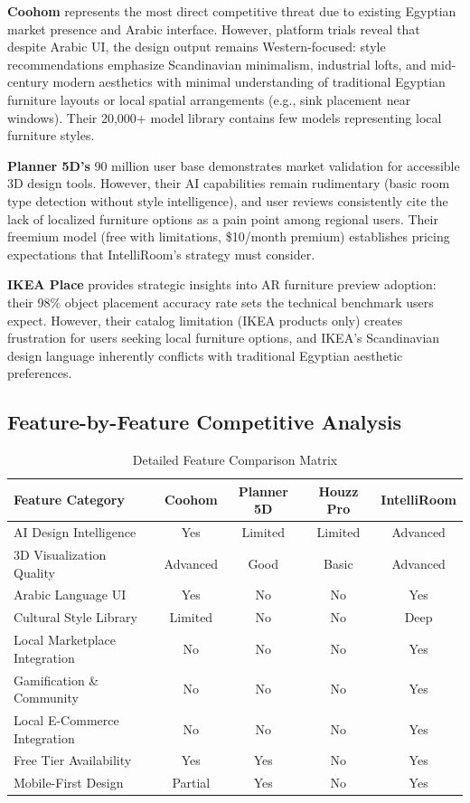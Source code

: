 \textbf{Coohom} represents the most direct competitive threat due to existing Egyptian market presence and Arabic interface. However, platform trials reveal that despite Arabic UI, the design output remains Western-focused: style recommendations emphasize Scandinavian minimalism, industrial lofts, and mid-century modern aesthetics with minimal understanding of traditional Egyptian furniture layouts or local spatial arrangements (e.g., sink placement near windows). Their 20,000+ model library contains few models representing local furniture styles.

\textbf{Planner 5D's} 90 million user base demonstrates market validation for accessible 3D design tools. However, their AI capabilities remain rudimentary (basic room type detection without style intelligence), and user reviews consistently cite the lack of localized furniture options as a pain point among regional users. Their freemium model (free with limitations, \$10/month premium) establishes pricing expectations that IntelliRoom's strategy must consider.

\textbf{IKEA Place} provides strategic insights into AR furniture preview adoption: their 98\% object placement accuracy rate sets the technical benchmark users expect. However, their catalog limitation (IKEA products only) creates frustration for users seeking local furniture options, and IKEA's Scandinavian design language inherently conflicts with traditional Egyptian aesthetic preferences.

\subsection{Feature-by-Feature Competitive Analysis}

\begin{table}[htbp]
\centering
\caption{Detailed Feature Comparison Matrix}
\label{tab:feature_comparison}
\begin{tabular}{lcccc}
\toprule
\textbf{Feature Category} & \textbf{Coohom} & \textbf{Planner 5D} & \textbf{Houzz Pro} & \textbf{IntelliRoom} \\
\midrule
AI Design Intelligence & Yes & Limited & Limited & Advanced \\
3D Visualization Quality & Advanced & Good & Basic & Advanced \\
Arabic Language UI & Yes & No & No & Yes \\
Cultural Style Library & Limited & No & No & Deep \\
Local Marketplace Integration & No & No & No & Yes \\
Gamification \& Community & No & No & No & Yes \\
Local E-Commerce Integration & No & No & No & Yes \\
Free Tier Availability & Yes & Yes & No & Yes \\
Mobile-First Design & Partial & Yes & No & Yes \\
\bottomrule
\end{tabular}
\end{table}

